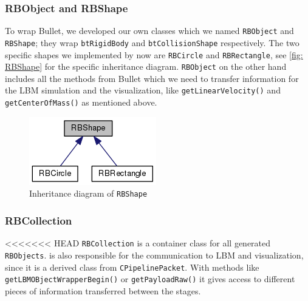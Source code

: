 \subsubsection*{RBObject and RBShape}
To wrap Bullet, we developed our own classes which we named \texttt{RBObject} and \texttt{RBShape}; they wrap \texttt{btRigidBody} and \texttt{btCollisionShape} respectively. The two specific shapes we implemented by now are \texttt{RBCircle} and \texttt{RBRectangle}, see \autoref{fig: RBShape} for the specific inheritance diagram.  
\texttt{RBObject} on the other hand includes all the methods from Bullet which we need to transfer information for the LBM simulation and the visualization, like \texttt{getLinearVelocity()} and \texttt{getCenterOfMass()} as mentioned above. 
\begin{figure}[ht]
\centering
\includegraphics[scale=0.5]{img/RigidBodies/RBShapeGraph.png}
\caption{Inheritance diagram of \texttt{RBShape}}
\label{fig: RBShape}
\end{figure}

\subsubsection*{RBCollection}
<<<<<<< HEAD
\texttt{RBCollection} is a container class for all generated \texttt{RBObjects}. is also responsible for the communication to LBM and visualization, since it is a derived class from \texttt{CPipelinePacket}. With methods like \texttt{getLBMOBjectWrapperBegin()} or \texttt{getPayloadRaw()} it gives access to different pieces of information transferred between the stages. 

